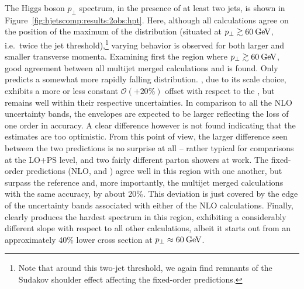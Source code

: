 The Higgs boson $p_\perp$ spectrum, in the presence of at least two
jets, is shown in Figure~\ref{fig:hjetscomp:results:2obs:hpt}.
Here, although all calculations agree on the position of the maximum
of the distribution (situated at $p_\perp\gtrsim 60\text{\:GeV}$, i.e.~twice the 
jet threshold),\footnote{Note that around this two-jet threshold, we
  again find remnants of the Sudakov shoulder effect affecting the
  fixed-order predictions.}
varying behavior is observed for both larger and smaller 
transverse momenta. Examining first the region where $p_\perp\gtrsim 
60\text{\:GeV}$, good agreement between all multijet merged calculations and 
\Powheg is found. Only \Herwig predicts a somewhat more rapidly falling 
distribution. \Sherpa \NNLOPS, due to its scale choice, exhibits a 
more or less constant $\mathcal{O}(+20\%)$ offset with respect to the
\Powheg \NNLOPS, but remains well within their respective uncertainties.
In comparison to all the NLO uncertainty bands, the \NNLOPS envelopes
are expected to be larger reflecting the loss of one order in accuracy.
A clear difference however is not found indicating that the \NNLOPS
estimates are too optimistic. From this point of view, the larger
difference seen between the two \NNLOPS predictions is no surprise at
all -- rather typical for comparisons at the LO+PS level, and two
fairly different parton showers at work. The fixed-order
predictions (NLO, \Minlo and \Loopsim) agree well in this region with
one another, but surpass the \Powheg reference and, more importantly,
the multijet merged calculations with the same accuracy, by about 
20\%. This deviation is just covered by the edge of the uncertainty
bands associated with either of the NLO calculations. Finally, \Hej
clearly produces the hardest spectrum in this region, exhibiting a
considerably different slope with respect to all other calculations,
albeit it starts out from an approximately 40\% lower cross section at
$p_\perp\approx 60\text{\:GeV}$.


